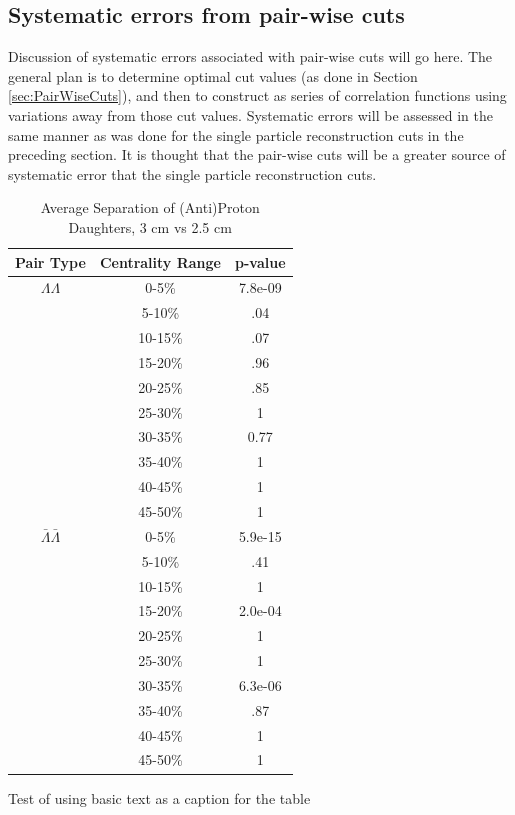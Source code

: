 \subsection{Systematic errors from pair-wise cuts}
\label{sec:SystematicsPairWise}

Discussion of systematic errors associated with pair-wise cuts will go here.  The general plan is to determine optimal cut values (as done in Section \ref{sec:PairWiseCuts}), and then to construct as series of correlation functions using variations away from those cut values.  Systematic errors will be assessed in the same manner as was done for the single particle reconstruction cuts in the preceding section.  It is thought that the pair-wise cuts will be a greater source of systematic error that the single particle reconstruction cuts.

\begin{table}
\caption{Average Separation of (Anti)Proton Daughters, 3 cm vs 2.5 cm} \label{tab:AvgSepProtDaughters3cmVs25cm}
\begin{center}
\begin{tabular}{| c | c | c |}
  \hline                       
  Pair Type & Centrality Range & p-value \\
  \hline
  $\Lambda\Lambda$ & 0-5\% & 7.8e-09 \\
   & 5-10\%  & .04 \\
   & 10-15\% & .07 \\
   & 15-20\% & .96 \\
   & 20-25\% & .85 \\
   & 25-30\% & 1 \\
   & 30-35\% & 0.77 \\
   & 35-40\% & 1 \\
   & 40-45\% & 1 \\
   & 45-50\% & 1 \\
   \hline
  $\bar{\Lambda}\bar{\Lambda}$ &  0-5\% & 5.9e-15 \\
   & 5-10\% & .41 \\
   & 10-15\% & 1 \\
   & 15-20\% & 2.0e-04 \\
   & 20-25\% & 1 \\
   & 25-30\% & 1 \\
   & 30-35\% & 6.3e-06 \\
   & 35-40\% & .87 \\
   & 40-45\% & 1 \\
   & 45-50\% & 1 \\
  \hline  
\end{tabular}
Test of using basic text as a caption for the table
\end{center}
\end{table}

